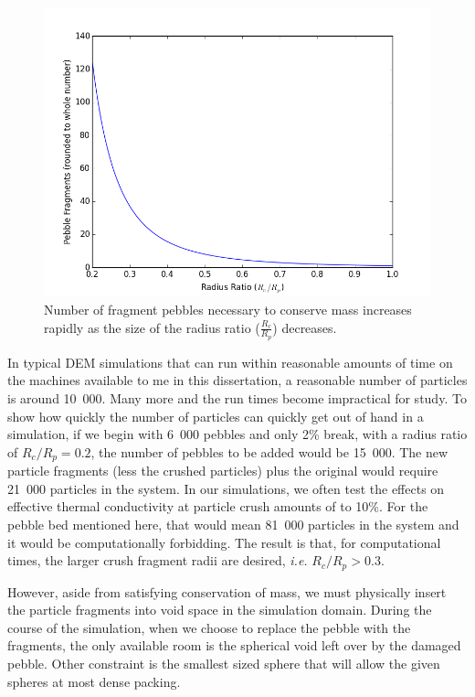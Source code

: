 \begin{figure}[!t]
\centering
    \includegraphics[width=\singleimagewidth]{chapters/figures/crush-fragments/pebble-fragment-count.png}
    \caption{Number of fragment pebbles necessary to conserve mass increases rapidly as the size of the radius ratio ($\frac{R_c}{R_p}$) decreases.}
    \label{fig:fragment-count}
\end{figure}

In typical DEM simulations that can run within reasonable amounts of time on the machines available to me in this dissertation, a reasonable number of particles is around 10~000. Many more and the run times become impractical for study. To show how quickly the number of particles can quickly get out of hand in a simulation, if we begin with 6~000 pebbles and only 2\% break, with a radius ratio of $R_c/R_p = 0.2$, the number of pebbles to be added would be 15~000. The new particle fragments (less the crushed particles) plus the original would require 21~000 particles in the system. In our simulations, we often test the effects on effective thermal conductivity at particle crush amounts of to 10\%. For the pebble bed mentioned here, that would mean 81~000 particles in the system and it would be computationally forbidding. The result is that, for computational times, the larger crush fragment radii are desired, \textit{i.e.} $R_c/R_p > 0.3$.

However, aside from satisfying conservation of mass, we must physically insert the particle fragments into void space in the simulation domain. During the course of the simulation, when we choose to replace the pebble with the fragments, the only available room is the spherical void left over by the damaged pebble. Other constraint is the smallest sized sphere that will allow the given spheres at most dense packing. 

